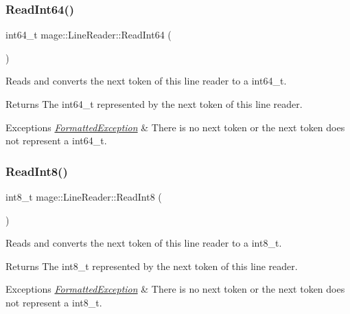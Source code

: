 \subsubsection{\texorpdfstring{Read\+Int64()}{ReadInt64()}}
{\footnotesize\ttfamily int64\+\_\+t mage\+::\+Line\+Reader\+::\+Read\+Int64 (\begin{DoxyParamCaption}{ }\end{DoxyParamCaption})\hspace{0.3cm}{\ttfamily [protected]}}

Reads and converts the next token of this line reader to a {\ttfamily int64\+\_\+t}.

\begin{DoxyReturn}{Returns}
The {\ttfamily int64\+\_\+t} represented by the next token of this line reader. 
\end{DoxyReturn}

\begin{DoxyExceptions}{Exceptions}
{\em \hyperlink{structmage_1_1_formatted_exception}{Formatted\+Exception}} & There is no next token or the next token does not represent a {\ttfamily int64\+\_\+t}. \\
\hline
\end{DoxyExceptions}
\hypertarget{classmage_1_1_line_reader_a3b88ec3a8555d79b25c2a8818a26f124}{}\label{classmage_1_1_line_reader_a3b88ec3a8555d79b25c2a8818a26f124} 
\subsubsection{\texorpdfstring{Read\+Int8()}{ReadInt8()}}
{\footnotesize\ttfamily int8\+\_\+t mage\+::\+Line\+Reader\+::\+Read\+Int8 (\begin{DoxyParamCaption}{ }\end{DoxyParamCaption})\hspace{0.3cm}{\ttfamily [protected]}}

Reads and converts the next token of this line reader to a {\ttfamily int8\+\_\+t}.

\begin{DoxyReturn}{Returns}
The {\ttfamily int8\+\_\+t} represented by the next token of this line reader. 
\end{DoxyReturn}

\begin{DoxyExceptions}{Exceptions}
{\em \hyperlink{structmage_1_1_formatted_exception}{Formatted\+Exception}} & There is no next token or the next token does not represent a {\ttfamily int8\+\_\+t}. \\
\hline
\end{DoxyExceptions}
\hypertarget{classmage_1_1_line_reader_acfb2f7279ec77d070a86d7db812d4745}{}\label{classmage_1_1_line_reader_acfb2f7279ec77d070a86d7db812d4745} 

